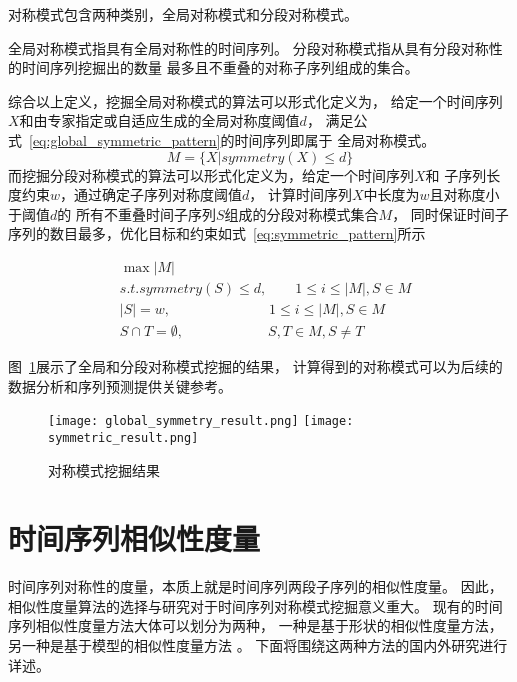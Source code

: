\begin{definition}
  对称模式包含两种类别，全局对称模式和分段对称模式。

  全局对称模式指具有全局对称性的时间序列。
  分段对称模式指从具有分段对称性的时间序列挖掘出的数量
  最多且不重叠的对称子序列组成的集合。 
  
\end{definition}

综合以上定义，挖掘全局对称模式的算法可以形式化定义为，
给定一个时间序列$X$和由专家指定或自适应生成的全局对称度阈值$d$，
满足公式~\ref{eq:global_symmetric_pattern}的时间序列即属于
全局对称模式。
\begin{equation}
  M = \{X | symmetry(X) \leq d\}
  \label{eq:global_symmetric_pattern}
\end{equation}
而挖掘分段对称模式的算法可以形式化定义为，给定一个时间序列$X$和
子序列长度约束$w$，通过确定子序列对称度阈值$d$，
计算时间序列$X$中长度为$w$且对称度小于阈值$d$的
所有不重叠时间子序列$S$组成的分段对称模式集合$M$，
同时保证时间子序列的数目最多，优化目标和约束如式~\ref{eq:symmetric_pattern}所示

\begin{equation}
  \begin{split}
    & \max \left| M \right| \\
    & s.t. symmetry \left( S \right) \leq d, \qquad 1 \leq i \leq \left| M \right|,S \in M \\
    & \left| S \right| = w, \qquad \qquad \qquad \quad 1 \leq i \leq \left| M \right|,S \in M \\
    & S \cap T = \emptyset, \qquad \qquad \qquad S,T \in M,S \neq T
  \end{split}
  \label{eq:symmetric_pattern}
\end{equation}

图~\ref{fig:symmetric_result}展示了全局和分段对称模式挖掘的结果，
计算得到的对称模式可以为后续的数据分析和序列预测提供关键参考。
\begin{figure}
  \centering
    {\texttt{[image: global\_symmetry\_result.png]}}
    {\texttt{[image: symmetric\_result.png]}}
  \caption{对称模式挖掘结果}
  \label{fig:symmetric_result}
\end{figure}

\section{时间序列相似性度量}
时间序列对称性的度量，本质上就是时间序列两段子序列的相似性度量。
因此，相似性度量算法的选择与研究对于时间序列对称模式挖掘意义重大。
现有的时间序列相似性度量方法大体可以划分为两种，
一种是基于形状的相似性度量方法，另一种是基于模型的相似性度量方法
\cite{DBLP:journals/vldb/SuLZZZ20}。
下面将围绕这两种方法的国内外研究进行详述。

